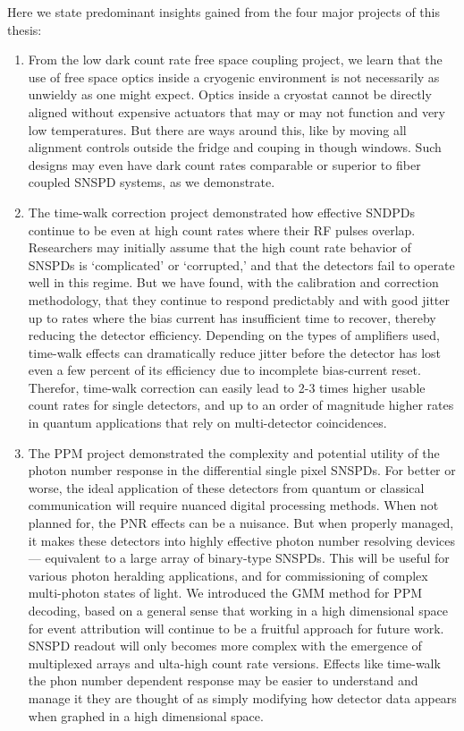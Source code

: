 \documentclass[11pt]{caltech_thesis} %
\begin{document}
Here we state predominant insights gained from the four major projects of this thesis:

\begin{enumerate}
\def\labelenumi{\arabic{enumi}.}
\item
  From the low dark count rate free space coupling project, we learn that the use of free space optics inside a cryogenic environment is not necessarily as unwieldy as one might expect. Optics inside a cryostat cannot be directly aligned without expensive actuators that may or may not function and very low temperatures. But there are ways around this, like by moving all alignment controls outside the fridge and couping in though windows. Such designs may even have dark count rates comparable or superior to fiber coupled SNSPD systems, as we demonstrate.
\item
  The time-walk correction project demonstrated how effective SNDPDs continue to be even at high count rates where their RF pulses overlap. Researchers may initially assume that the high count rate behavior of SNSPDs is `complicated' or `corrupted,' and that the detectors fail to operate well in this regime. But we have found, with the calibration and correction methodology, that they continue to respond predictably and with good jitter up to rates where the bias current has insufficient time to recover, thereby reducing the detector efficiency. Depending on the types of amplifiers used, time-walk effects can dramatically reduce jitter before the detector has lost even a few percent of its efficiency due to incomplete bias-current reset. Therefor, time-walk correction can easily lead to 2-3 times higher usable count rates for single detectors, and up to an order of magnitude higher rates in quantum applications that rely on multi-detector coincidences.
\item
  The PPM project demonstrated the complexity and potential utility of the photon number response in the differential single pixel SNSPDs. For better or worse, the ideal application of these detectors from quantum or classical communication will require nuanced digital processing methods. When not planned for, the PNR effects can be a nuisance. But when properly managed, it makes these detectors into highly effective photon number resolving devices --- equivalent to a large array of binary-type SNSPDs. This will be useful for various photon heralding applications, and for commissioning of complex multi-photon states of light. We introduced the GMM method for PPM decoding, based on a general sense that working in a high dimensional space for event attribution will continue to be a fruitful approach for future work. SNSPD readout will only becomes more complex with the emergence of multiplexed arrays and ulta-high count rate versions. Effects like time-walk the phon number dependent response may be easier to understand and manage it they are thought of as simply modifying how detector data appears when graphed in a high dimensional space.

\end{enumerate}
\end{document}
